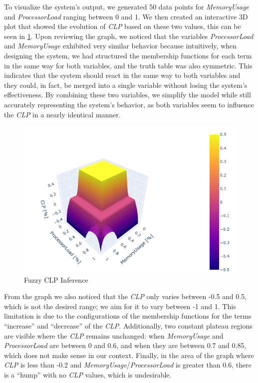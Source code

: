 \documentclass[titlepage]{article}
\begin{document}
To visualize the system's output, we generated 50 data points for \textit{MemoryUsage} and \textit{ProcessorLoad} ranging between 0 and 1.
We then created an interactive 3D plot that showed the evolution of \textit{CLP} based on these two values, this can be seen in \cref{fig:3d_triangular}.
Upon reviewing the graph, we noticed that the variables \textit{ProcessorLoad} and \textit{MemoryUsage} exhibited very similar behavior because intuitively, when designing the system, we had structured the membership functions for each term in the same way for both variables, and the truth table was also symmetric.
This indicates that the system should react in the same way to both variables and they could, in fact, be merged into a single variable without losing the system's effectiveness.
By combining these two variables, we simplify the model while still accurately representing the system's behavior, as both variables seem to influence the \textit{CLP} in a nearly identical manner.


\begin{figure}[H]
    \centering
\includegraphics[scale = 0.8]{../images/3d_triangular}
\caption{Fuzzy CLP Inference}
\label{fig:3d_triangular}
\end{figure}

\vspace{10mm}

From the graph we also noticed that the \textit{CLP} only varies between -0.5 and 0.5, which is not the desired range; we aim for it to vary between -1 and 1.
This limitation is due to the configurations of the membership functions for the terms ``increase'' and ``decrease'' of the \textit{CLP}.
Additionally, two constant plateau regions are visible where the \textit{CLP} remains unchanged: when \textit{MemoryUsage} and \textit{ProcessorLoad} are between 0 and 0.6, and when they are between 0.7 and 0.85, which does not make sense in our context.
Finally, in the area of the graph where \textit{CLP} is less than -0.2 and \textit{MemoryUsage}/\textit{ProcessorLoad} is greater than 0.6, there is a ``hump'' with no \textit{CLP} values, which is undesirable.
\end{document}
